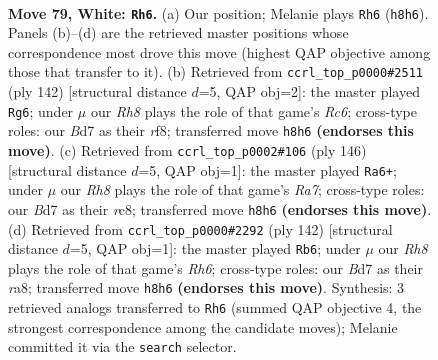 \documentclass[11pt]{article}
\begin{document}
\clearpage

\begin{figure}[p]\centering
\begin{subfigure}{0.46\textwidth}\centering
\resizebox{\linewidth}{!}{%
\newchessgame
\chessboard[
  setfen={7R/3B1P2/8/k7/7P/8/5K2/8 w - - 1 79},
  showmover=false,
  pgfstyle=straightmove, color=movearrow, markmove={h8-h6}
]}
\caption{}
\end{subfigure}\hfill
\begin{subfigure}{0.46\textwidth}\centering
\resizebox{\linewidth}{!}{%
\newchessgame
\chessboard[
  setfen={5r2/k7/2R5/p7/8/8/K1P5/8 w - - 16 72},
  showmover=false,
  pgfstyle=straightmove, color=movearrow, markmove={c6-g6}
]}
\caption{}
\end{subfigure}
\\[4pt]
\begin{subfigure}{0.46\textwidth}\centering
\resizebox{\linewidth}{!}{%
\newchessgame
\chessboard[
  setfen={2r5/R7/5k2/7p/P7/8/5K2/8 w - - 18 74},
  showmover=false,
  pgfstyle=straightmove, color=movearrow, markmove={a7-a6}
]}
\caption{}
\end{subfigure}\hfill
\begin{subfigure}{0.46\textwidth}\centering
\resizebox{\linewidth}{!}{%
\newchessgame
\chessboard[
  setfen={r7/8/7R/5p2/7P/2K2k2/8/8 w - - 5 72},
  showmover=false,
  pgfstyle=straightmove, color=movearrow, markmove={h6-b6}
]}
\caption{}
\end{subfigure}
\caption{\textbf{Move 79, White: \texttt{Rh6}.} (a) Our position; Melanie plays \texttt{Rh6} (\texttt{h8h6}). Panels (b)--(d) are the retrieved master positions whose correspondence most drove this move (highest QAP objective among those that transfer to it). (b) Retrieved from \texttt{ccrl\_top\_p0000\#2511} (ply 142) [structural distance $d$=5, QAP obj=2]: the master played \texttt{Rg6}; under $\mu$ our \emph{Rh8} plays the role of that game's \emph{Rc6}; cross-type roles: our \emph{B}d7 as their \emph{r}f8; transferred move \texttt{h8h6} \textbf{(endorses this move)}. (c) Retrieved from \texttt{ccrl\_top\_p0002\#106} (ply 146) [structural distance $d$=5, QAP obj=1]: the master played \texttt{Ra6+}; under $\mu$ our \emph{Rh8} plays the role of that game's \emph{Ra7}; cross-type roles: our \emph{B}d7 as their \emph{r}c8; transferred move \texttt{h8h6} \textbf{(endorses this move)}. (d) Retrieved from \texttt{ccrl\_top\_p0000\#2292} (ply 142) [structural distance $d$=5, QAP obj=1]: the master played \texttt{Rb6}; under $\mu$ our \emph{Rh8} plays the role of that game's \emph{Rh6}; cross-type roles: our \emph{B}d7 as their \emph{r}a8; transferred move \texttt{h8h6} \textbf{(endorses this move)}. Synthesis: 3 retrieved analogs transferred to \texttt{Rh6} (summed QAP objective 4, the strongest correspondence among the candidate moves); Melanie committed it via the \texttt{search} selector.}
\label{fig:thought-m156}
\end{figure}
\end{document}
